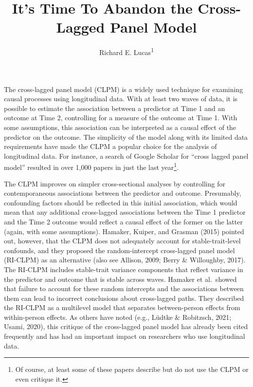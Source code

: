 \documentclass[
  english,
  man,floatsintext]{apa6}
\title{It's Time To Abandon the Cross-Lagged Panel Model}
\author{Richard E. Lucas\textsuperscript{1}}
\date{}
\affiliation{\vspace{0.5cm}\textsuperscript{1} Department of Psychology, Michigan State University}
\begin{document}
\maketitle

The cross-lagged panel model (CLPM) is a widely used technique for examining causal processes using longitudinal data. With at least two waves of data, it is possible to estimate the association between a predictor at Time 1 and an outcome at Time 2, controlling for a measure of the outcome at Time 1. With some assumptions, this association can be interpreted as a causal effect of the predictor on the outcome. The simplicity of the model along with its limited data requirements have made the CLPM a popular choice for the analysis of longitudinal data. For instance, a search of Google Scholar for ``cross lagged panel model'' resulted in over 1,000 papers in just the last year\footnote{Of course, at least some of these papers describe but do not use the CLPM or even critique it.}.

The CLPM improves on simpler cross-sectional analyses by controlling for contemporaneous associations between the predictor and outcome. Presumably, confounding factors should be reflected in this initial association, which would mean that any additional cross-lagged associations between the Time 1 predictor and the Time 2 outcome would reflect a causal effect of the former on the latter (again, with some assumptions). Hamaker, Kuiper, and Grasman (2015) pointed out, however, that the CLPM does not adequately account for stable-trait-level confounds, and they proposed the random-intercept cross-lagged panel model (RI-CLPM) as an alternative (also see Allison, 2009; Berry \& Willoughby, 2017). The RI-CLPM includes stable-trait variance components that reflect variance in the predictor and outcome that is stable across waves. Hamaker et al.~showed that failure to account for these random intercepts and the associations between them can lead to incorrect conclusions about cross-lagged paths. They described the RI-CLPM as a multilevel model that separates between-person effects from within-person effects. As others have noted (e.g., Lüdtke \& Robitzsch, 2021; Usami, 2020), this critique of the cross-lagged panel model has already been cited frequently and has had an important impact on researchers who use longitudinal data.
\end{document}
